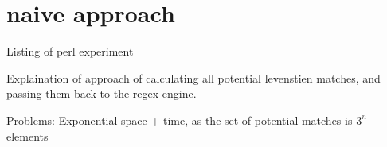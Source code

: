 \section{naive approach}
\label{sec:naive}

Listing of perl experiment

Explaination of approach of calculating all potential levenstien matches, and passing them back to the regex engine.

Problems:
Exponential space + time, as the set of potential matches is $3^n$ elements
